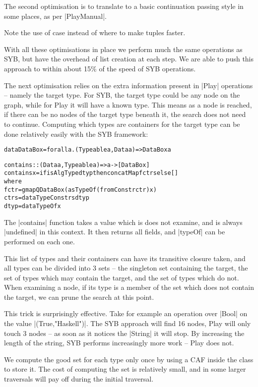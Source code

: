 \documentclass[preprint]{sigplanconf}
\newenvironment{code}{\begin{alltt}\small}{\end{alltt}}
\begin{document}
The second optimisation is to translate to a basic continuation passing style in some places, as per |PlayManual|.

Note the use of case instead of where to make tuples faster.

With all these optimisations in place we perform much the same operations as SYB, but have the overhead of list creation at each step. We are able to push this approach to within about 15\% of the speed of SYB operations.

The next optimisation relies on the extra information present in |Play| operations -- namely the target type. For SYB, the target type could be any node on the graph, while for Play it will have a known type. This means as a node is reached, if there can be no nodes of the target type beneath it, the search does not need to continue. Computing which types are containers for the target type can be done relatively easily with the SYB framework:

\begin{code}
data DataBox = forall a . (Typeable a, Data a) => DataBox a

contains :: (Data a, Typeable a) => a -> [DataBox]
contains x = if isAlgType dtyp then concatMap f ctrs else []
    where
        f ctr = gmapQ DataBox (asTypeOf (fromConstr ctr) x)
        ctrs = dataTypeConstrs dtyp
        dtyp = dataTypeOf x
\end{code}

The |contains| function takes a value which is does not examine, and is always |undefined| in this context. It then returns all fields, and |typeOf| can be performed on each one.

This list of types and their containers can have its transitive closure taken, and all types can be divided into 3 sets -- the singleton set containing the target, the set of types which may contain the target, and the set of types which do not. When examining a node, if its type is a member of the set which does not contain the target, we can prune the search at this point.

This trick is surprisingly effective. Take for example an operation over |Bool| on the value |(True,"Haskell")|. The SYB approach will find 16 nodes, Play will only touch 3 nodes -- as soon as it notices the |String| it will stop. By increasing the length of the string, SYB performs increasingly more work -- Play does not.

We compute the good set for each type only once by using a CAF inside the class to store it. The cost of computing the set is relatively small, and in some larger traversals will pay off during the initial traversal.
\end{document}

